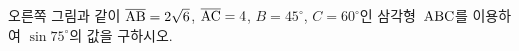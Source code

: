 \noindent\begin{minipage}[t]{0.58\linewidth}\vspace{0pt}\raggedright 오른쪽 그림과 같이 $\overline{\mathrm{AB}}=2\sqrt{6}$, $\overline{\mathrm{AC}}=4$, $B=45^\circ$, $C=60^\circ$인 삼각형~$\mathrm{ABC}$를 이용하여 $\sin 75^\circ$의 값을 구하시오.\end{minipage}\hfill\begin{minipage}[t]{0.4\linewidth}\vspace{0pt}\centering \resizebox{\ifdim\width>\linewidth\linewidth\else\width\fi}{!}{}\end{minipage}\par
